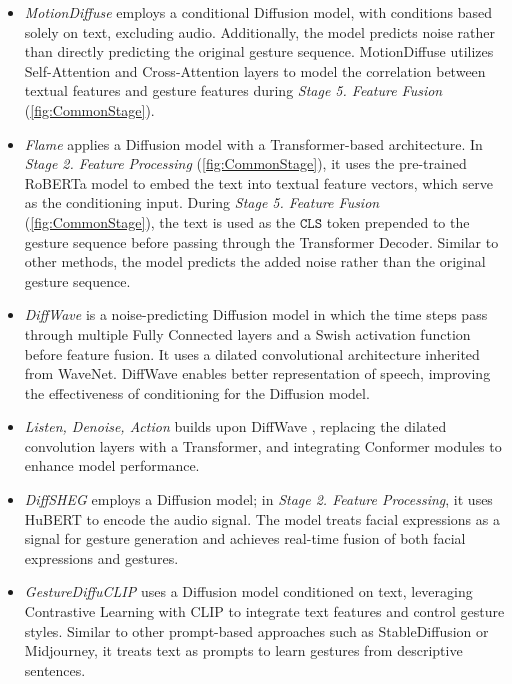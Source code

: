 \begin{itemize}
	\item \textit{MotionDiffuse} \cite{zhang2022motiondiffuse} employs a conditional Diffusion model, with conditions based solely on text, excluding audio. Additionally, the model predicts noise rather than directly predicting the original gesture sequence. MotionDiffuse utilizes Self-Attention and Cross-Attention layers to model the correlation between textual features and gesture features during \textit{Stage 5. Feature Fusion} (\autoref{fig:CommonStage}).
	
	\item \textit{Flame} \cite{kim2023flame} applies a Diffusion model with a Transformer-based architecture. In \textit{Stage 2. Feature Processing} (\autoref{fig:CommonStage}), it uses the pre-trained RoBERTa model to embed the text into textual feature vectors, which serve as the conditioning input. During \textit{Stage 5. Feature Fusion} (\autoref{fig:CommonStage}), the text is used as the $\texttt{CLS}$ token prepended to the gesture sequence before passing through the Transformer Decoder. Similar to other methods, the model predicts the added noise rather than the original gesture sequence.
	
	\item \textit{DiffWave} \cite{kong2020diffwave} is a noise-predicting Diffusion model in which the time steps pass through multiple Fully Connected layers and a Swish activation function before feature fusion. It uses a dilated convolutional architecture inherited from WaveNet. DiffWave enables better representation of speech, improving the effectiveness of conditioning for the Diffusion model.
	
	\item \textit{Listen, Denoise, Action} \cite{alexanderson2022listen} builds upon DiffWave \cite{kong2020diffwave}, replacing the dilated convolution layers with a Transformer, and integrating Conformer modules to enhance model performance.
	
	\item \textit{DiffSHEG} \cite{chen2024diffsheg} employs a Diffusion model; in \textit{Stage 2. Feature Processing}, it uses HuBERT to encode the audio signal. The model treats facial expressions as a signal for gesture generation and achieves real-time fusion of both facial expressions and gestures.
	
	\item \textit{GestureDiffuCLIP} \cite{ao2023gesturediffuclip} uses a Diffusion model conditioned on text, leveraging Contrastive Learning with CLIP to integrate text features and control gesture styles. Similar to other prompt-based approaches such as StableDiffusion or Midjourney, it treats text as prompts to learn gestures from descriptive sentences.
	

\end{itemize}
